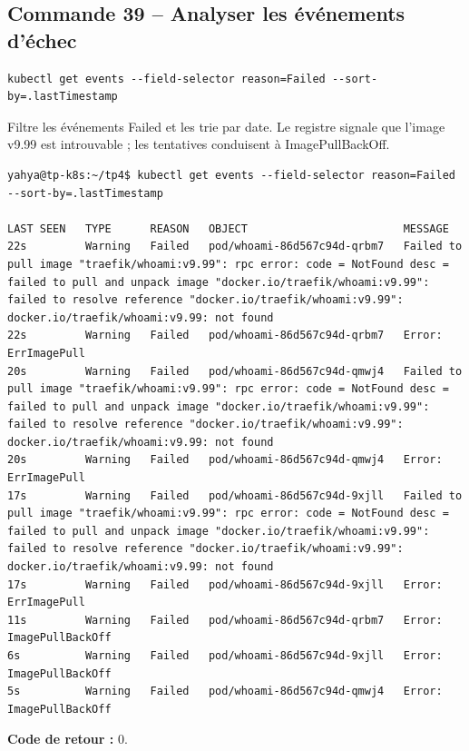 \documentclass[11pt,a4paper]{article}
\begin{document}
\subsection{Commande 39 -- Analyser les événements d’échec}
\begin{lstlisting}
kubectl get events --field-selector reason=Failed --sort-by=.lastTimestamp
\end{lstlisting}
Filtre les événements Failed et les trie par date. Le registre signale que l’image v9.99 est introuvable ; les tentatives conduisent à ImagePullBackOff.
\begin{tcolorbox}[terminal,title={Ubuntu / WSL2 -- Commande 39 -- rendu reconstitué}]
\begin{Verbatim}[fontsize=\scriptsize,breaklines=true,breakanywhere=true,breaksymbolleft={},breaksymbolright={}]
yahya@tp-k8s:~/tp4$ kubectl get events --field-selector reason=Failed --sort-by=.lastTimestamp

LAST SEEN   TYPE      REASON   OBJECT                        MESSAGE
22s         Warning   Failed   pod/whoami-86d567c94d-qrbm7   Failed to pull image "traefik/whoami:v9.99": rpc error: code = NotFound desc = failed to pull and unpack image "docker.io/traefik/whoami:v9.99": failed to resolve reference "docker.io/traefik/whoami:v9.99": docker.io/traefik/whoami:v9.99: not found
22s         Warning   Failed   pod/whoami-86d567c94d-qrbm7   Error: ErrImagePull
20s         Warning   Failed   pod/whoami-86d567c94d-qmwj4   Failed to pull image "traefik/whoami:v9.99": rpc error: code = NotFound desc = failed to pull and unpack image "docker.io/traefik/whoami:v9.99": failed to resolve reference "docker.io/traefik/whoami:v9.99": docker.io/traefik/whoami:v9.99: not found
20s         Warning   Failed   pod/whoami-86d567c94d-qmwj4   Error: ErrImagePull
17s         Warning   Failed   pod/whoami-86d567c94d-9xjll   Failed to pull image "traefik/whoami:v9.99": rpc error: code = NotFound desc = failed to pull and unpack image "docker.io/traefik/whoami:v9.99": failed to resolve reference "docker.io/traefik/whoami:v9.99": docker.io/traefik/whoami:v9.99: not found
17s         Warning   Failed   pod/whoami-86d567c94d-9xjll   Error: ErrImagePull
11s         Warning   Failed   pod/whoami-86d567c94d-qrbm7   Error: ImagePullBackOff
6s          Warning   Failed   pod/whoami-86d567c94d-9xjll   Error: ImagePullBackOff
5s          Warning   Failed   pod/whoami-86d567c94d-qmwj4   Error: ImagePullBackOff
\end{Verbatim}
\end{tcolorbox}
\textbf{Code de retour :} 0.
\end{document}
